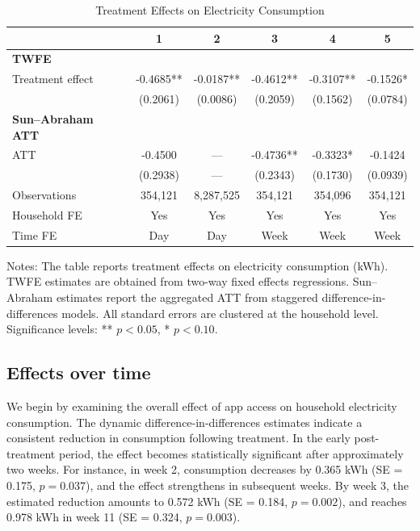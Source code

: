 \begin{table}[htbp]\centering
\caption{Treatment Effects on Electricity Consumption}
\label{table:main_results}
\begin{threeparttable}
\begin{tabular}{lccccc}
\toprule
 & 1 & 2 & 3 & 4 & 5 \\
\midrule

\textbf{TWFE} \\
Treatment effect 
& -0.4685** 
& -0.0187** 
& -0.4612** 
& -0.3107** 
& -0.1526* \\
& (0.2061) 
& (0.0086) 
& (0.2059) 
& (0.1562) 
& (0.0784) \\

\addlinespace
\textbf{Sun--Abraham ATT} \\
ATT 
& -0.4500 
& --- 
& -0.4736** 
& -0.3323* 
& -0.1424 \\
& (0.2938) 
& --- 
& (0.2343) 
& (0.1730) 
& (0.0939) \\

\midrule
Observations 
& 354,121 
& 8,287,525 
& 354,121 
& 354,096 
& 354,121 \\

Household FE & Yes & Yes & Yes & Yes & Yes \\
Time FE & Day & Day & Week & Week & Week \\

\bottomrule
\end{tabular}

\begin{tablenotes}
\footnotesize
\item Notes: The table reports treatment effects on electricity consumption (kWh). 
TWFE estimates are obtained from two-way fixed effects regressions. Sun--Abraham estimates report the aggregated ATT from staggered difference-in-differences models. 
All standard errors are clustered at the household level. 
Significance levels: ** $p<0.05$, * $p<0.10$.
\end{tablenotes}

\end{threeparttable}
\end{table}


\subsection{Effects over time}

We begin by examining the overall effect of app access on household electricity consumption. The dynamic difference-in-differences estimates indicate a consistent reduction in consumption following treatment. In the early post-treatment period, the effect becomes statistically significant after approximately two weeks. For instance, in week 2, consumption decreases by 0.365 kWh (SE = 0.175, $p = 0.037$), and the effect strengthens in subsequent weeks. By week 3, the estimated reduction amounts to 0.572 kWh (SE = 0.184, $p = 0.002$), and reaches 0.978 kWh in week 11 (SE = 0.324, $p = 0.003$). 

